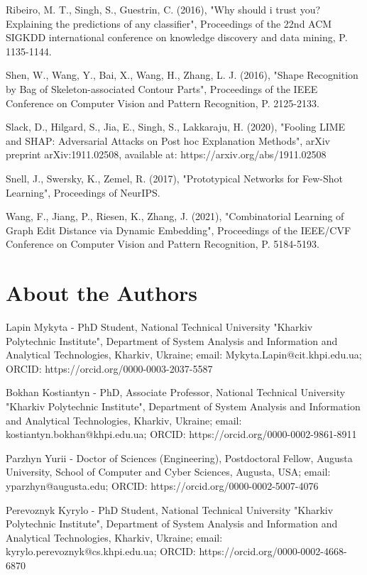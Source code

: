 \documentclass[a4paper,10pt]{article}
\begin{document}
Ribeiro, M. T., Singh, S., Guestrin, C. (2016), "Why should i trust you? Explaining the predictions of any classifier", Proceedings of the 22nd ACM SIGKDD international conference on knowledge discovery and data mining, P. 1135-1144.

Shen, W., Wang, Y., Bai, X., Wang, H., Zhang, L. J. (2016), "Shape Recognition by Bag of Skeleton-associated Contour Parts", Proceedings of the IEEE Conference on Computer Vision and Pattern Recognition, P. 2125-2133.

Slack, D., Hilgard, S., Jia, E., Singh, S., Lakkaraju, H. (2020), "Fooling LIME and SHAP: Adversarial Attacks on Post hoc Explanation Methods", arXiv preprint arXiv:1911.02508, available at: https://arxiv.org/abs/1911.02508

Snell, J., Swersky, K., Zemel, R. (2017), "Prototypical Networks for Few-Shot Learning", Proceedings of NeurIPS.

Wang, F., Jiang, P., Riesen, K., Zhang, J. (2021), "Combinatorial Learning of Graph Edit Distance via Dynamic Embedding", Proceedings of the IEEE/CVF Conference on Computer Vision and Pattern Recognition, P. 5184-5193.

\vspace{1cm}

\section*{About the Authors}

Lapin Mykyta - PhD Student, National Technical University "Kharkiv Polytechnic Institute", Department of System Analysis and Information and Analytical Technologies, Kharkiv, Ukraine; email: Mykyta.Lapin@cit.khpi.edu.ua; ORCID: https://orcid.org/0000-0003-2037-5587

Bokhan Kostiantyn - PhD, Associate Professor, National Technical University "Kharkiv Polytechnic Institute", Department of System Analysis and Information and Analytical Technologies, Kharkiv, Ukraine; email: kostiantyn.bokhan@khpi.edu.ua; ORCID: https://orcid.org/0000-0002-9861-8911

Parzhyn Yurii - Doctor of Sciences (Engineering), Postdoctoral Fellow, Augusta University, School of Computer and Cyber Sciences, Augusta, USA; email: yparzhyn@augusta.edu; ORCID: https://orcid.org/0000-0002-5007-4076

Perevoznyk Kyrylo - PhD Student, National Technical University "Kharkiv Polytechnic Institute", Department of System Analysis and Information and Analytical Technologies, Kharkiv, Ukraine; email: kyrylo.perevoznyk@cs.khpi.edu.ua; ORCID: https://orcid.org/0000-0002-4668-6870
\end{document}
